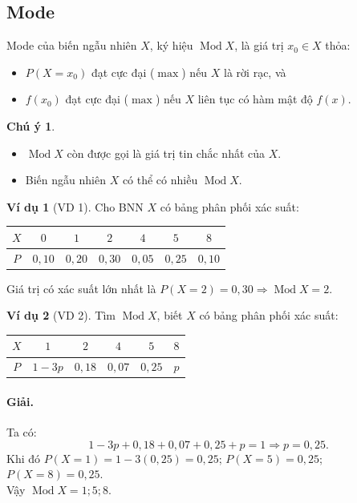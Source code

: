 \documentclass[12pt,a4paper]{article}
\theoremstyle{definition}
\newtheorem{vidu}{Ví dụ}[section]
\newtheorem{chuy}{Chú ý}[section]
\begin{document}
\subsection{Mode}
Mode của biến ngẫu nhiên $X$, ký hiệu $\operatorname{Mod} X$, là giá trị $x_0 \in X$ thỏa:
\begin{itemize}
    \item $P(X = x_0)$ đạt cực đại ($\max$) nếu $X$ là rời rạc, và
    \item $f(x_0)$ đạt cực đại ($\max$) nếu $X$ liên tục có hàm mật độ $f(x)$.
\end{itemize}

\begin{chuy}
\begin{itemize}
    \item $\operatorname{Mod} X$ còn được gọi là giá trị tin chắc nhất của $X$.
    \item Biến ngẫu nhiên $X$ có thể có nhiều $\operatorname{Mod} X$.
\end{itemize}
\end{chuy}

\begin{vidu}[VD 1]
Cho BNN $X$ có bảng phân phối xác suất:
\begin{center}
\begin{tabular}{|c|c|c|c|c|c|c|}
\hline
$X$ & $0$ & $1$ & $2$ & $4$ & $5$ & $8$ \\
\hline
$P$ & $0{,}10$ & $0{,}20$ & $0{,}30$ & $0{,}05$ & $0{,}25$ & $0{,}10$ \\
\hline
\end{tabular}
\end{center}
Giá trị có xác suất lớn nhất là $P(X = 2) = 0{,}30 \Rightarrow \operatorname{Mod} X = 2$.
\end{vidu}

\begin{vidu}[VD 2]
Tìm $\operatorname{Mod} X$, biết $X$ có bảng phân phối xác suất:
\begin{center}
\begin{tabular}{|c|c|c|c|c|c|}
\hline
$X$ & $1$ & $2$ & $4$ & $5$ & $8$ \\
\hline
$P$ & $1 - 3p$ & $0{,}18$ & $0{,}07$ & $0{,}25$ & $p$ \\
\hline
\end{tabular}
\end{center}

\paragraph{Giải.} Ta có:
\[
1 - 3p + 0{,}18 + 0{,}07 + 0{,}25 + p = 1 \Rightarrow p = 0{,}25.
\]
Khi đó $P(X = 1) = 1 - 3(0{,}25) = 0{,}25$; $P(X = 5) = 0{,}25$; $P(X = 8) = 0{,}25$.\\
Vậy $\operatorname{Mod} X = 1; 5; 8$.
\end{vidu}
\end{document}
